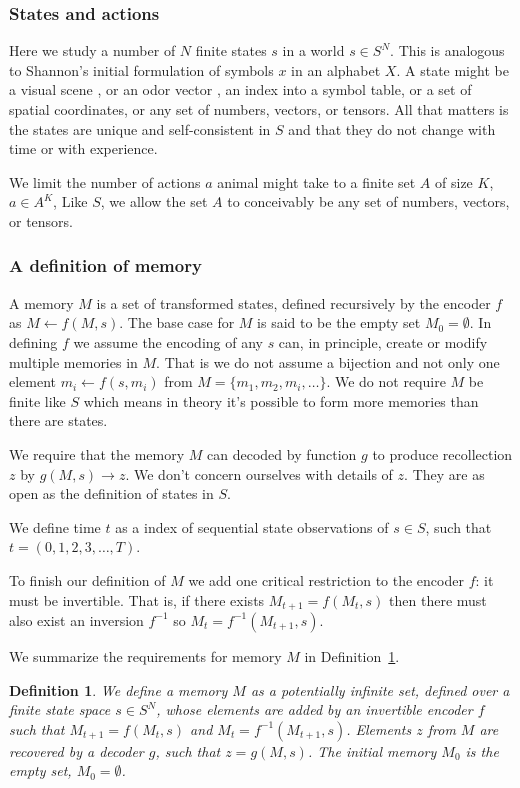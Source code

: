 \documentclass[9pt,twocolumn,twoside]{pnas-new}
\newtheorem{definition}{Definition}
\begin{document}
\subsubsection*{States and actions}
Here we study a number of $N$ finite states $s$ in a world $s \in S^N$. This is analogous to Shannon's initial formulation of symbols $x$ in an alphabet $X$. A state might be a visual scene \cite{Mnih2015}, or an odor vector \cite{Dasgupta2017,Calhoun2014}, an index into a symbol table, or a set of spatial coordinates, or any set of numbers, vectors, or tensors. All that matters is the states are unique and self-consistent in $S$ and that they do not change with time or with experience. 

We limit the number of actions $a$ animal might take to a finite set $A$ of size $K$, $a \in A^K$, Like $S$, we allow the set $A$ to conceivably be any set of numbers, vectors, or tensors.

\subsubsection*{A definition of memory}
A memory $M$ is a set of transformed states, defined recursively by the encoder $f$ as $M \leftarrow f(M, s)$. The base case for $M$ is said to be the empty set $M_{0} = \emptyset$. In defining $f$ we assume the encoding  of any $s$ can, in principle, create or modify multiple memories in $M$. That is we do not assume a bijection  and not only one element $m_i \leftarrow f(s, m_i)$ from $M = \{m_1, m_2, m_i, \ldots\}$. We do not require $M$ be finite like $S$ which means in theory it's possible to form more memories than there are states. 

We require that the memory $M$ can decoded by function $g$ to produce recollection $z$ by $g(M, s) \rightarrow z$. We don't concern ourselves with details of $z$. They are as open as the definition of states in $S$.

We define time $t$ as a index of sequential state observations of $s \in S$, such that $t = (0,1,2,3,\ldots,T)$.

To finish our definition of $M$ we add one critical restriction to the encoder $f$: it must be invertible. That is, if there exists $M_{t+1} = f(M_{t}, s)$ then there must also exist an inversion $f^{-1}$ so $M_{t} = f^{-1}(M_{t+1}, s)$. 

We summarize the requirements for memory $M$ in Definition~\ref{def:memory}.

\begin{definition}
\label{def:memory}
We define a memory $M$ as a potentially infinite set, defined over a finite state space $s \in S^N$, whose elements are added by an invertible encoder $f$ such that $M_{t+1} = f(M_{t}, s)$ and $M_{t} = f^{-1}(M_{t+1}, s)$. Elements $z$ from $M$ are recovered by a decoder $g$, such that $z = g(M, s)$. The initial memory $M_{0}$ is the empty set, $M_{0} = \emptyset$.
\end{definition}
\end{document}
